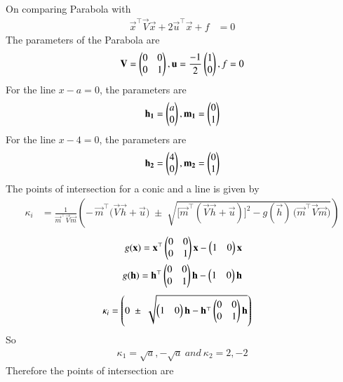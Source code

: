 \documentclass[journal]{IEEEtran}
\begin{document}
On comparing Parabola  with
\begin{align}
\vec{x}^\top\vec{V}\vec{x} + 2\vec{u}^\top\vec{x} + f &= 0 
\end{align}
The parameters of the Parabola are 
\begin{align}
\mathbf{V}=\begin{pmatrix}0&0\\0&1\end{pmatrix} , \mathbf{u}=\frac{-1}{2}\begin{pmatrix}1\\0\end{pmatrix} , f=0
\end{align}
For the line $x-a = 0$, the parameters are 
\begin{align}
\mathbf{h_1}=\begin{pmatrix}a\\0\end{pmatrix} , \mathbf{m_1}=\begin{pmatrix}0\\1\end{pmatrix}
\end{align}
For the line $x-4 = 0$, the parameters are
\begin{align}
\mathbf{h_2}=\begin{pmatrix}4\\0\end{pmatrix} , \mathbf{m_2}=\begin{pmatrix}0\\1\end{pmatrix}
\end{align}
The points of intersection for a conic and a line is given by
\begin{align}
\kappa_i
  &= \frac{1}{\vec{m}^\top \vec{V}\vec{m}}
     \left(
       -\,\vec{m}^\top\big(\vec{V}\vec{h}+\vec{u}\big)
       \;\pm\;
       \sqrt{ \big[\vec{m}^\top(\vec{V}\vec{h}+\vec{u})\big]^2
       - g(\vec{h})\,\big(\vec{m}^\top \vec{V}\vec{m}\big)}
     \right)
\end{align}
\begin{align}
g(\mathbf{x}) = \mathbf{x}^\top\begin{pmatrix}0&0\\0&1\end{pmatrix}\mathbf{x} - \begin{pmatrix}1 & 0\end{pmatrix}\mathbf{x} \\
g(\mathbf{h}) = \mathbf{h}^\top\begin{pmatrix}0&0\\0&1\end{pmatrix}\mathbf{h} - \begin{pmatrix}1 & 0\end{pmatrix}\mathbf{h}
\end{align}
\begin{align}
\kappa_i &=\left(
            0
       \;\pm\;
       \sqrt{\begin{pmatrix}1 & 0\end{pmatrix}\mathbf{h} - \mathbf{h}^\top\begin{pmatrix}0&0\\0&1\end{pmatrix}\mathbf{h}}
     \right)
\end{align}
So
\begin{align}
\kappa_1 = \sqrt{a} , -\sqrt{a} \ and \ \kappa_2 = 2 , -2
\end{align}
Therefore the points of intersection are 
\end{document}
